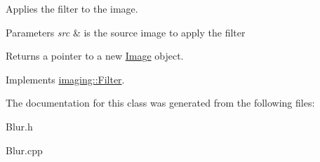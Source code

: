Applies the filter to the image.


\begin{DoxyParams}{Parameters}
{\em src} & is the source image to apply the filter\\
\hline
\end{DoxyParams}
\begin{DoxyReturn}{Returns}
a pointer to a new \hyperlink{classimaging_1_1_image}{Image} object. 
\end{DoxyReturn}


Implements \hyperlink{classimaging_1_1_filter_ab153f2e4e89dd744806299a29da8289b}{imaging\+::\+Filter}.



The documentation for this class was generated from the following files\+:\begin{DoxyCompactItemize}
\item 
Blur.\+h\item 
Blur.\+cpp\end{DoxyCompactItemize}
